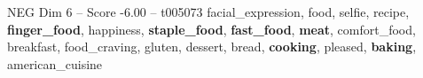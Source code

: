 \begin{textsample}{NEG Dim 6 – Score -6.00 – t005073}  \label{ex:f6_neg_033}
facial\_expression, food, selfie, recipe, \textbf{finger\_food}, happiness, \textbf{staple\_food}, \textbf{fast\_food}, \textbf{meat}, comfort\_food, breakfast, food\_craving, gluten, dessert, bread, \textbf{cooking}, pleased, \textbf{baking}, american\_cuisine

\end{textsample}
